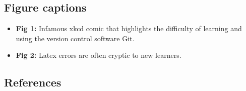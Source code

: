 \documentclass[
  12 pt,
]{paper}
\providecommand{\tightlist}{%
  \setlength{\itemsep}{0pt}\setlength{\parskip}{0pt}}
\begin{document}
\newpage

\hypertarget{figure-captions}{%
\subsection{Figure captions}\label{figure-captions}}

\begin{itemize}
\tightlist
\item
  \textbf{Fig 1:} Infamous xkcd comic that highlights the difficulty of learning and using the version control software Git.
\item
  \textbf{Fig 2:} Latex errors are often cryptic to new learners.
\end{itemize}

\newpage
\singlespace
\footnotesize

\hypertarget{references}{%
\subsection*{References}\label{references}}
\end{document}
